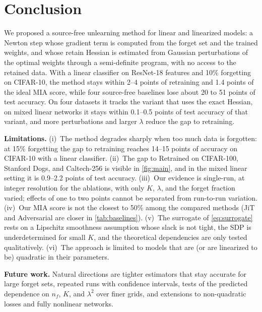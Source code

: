 \documentclass[10pt,twocolumn,letterpaper]{article}
\begin{document}

\section{Conclusion}
\label{sec:conclusion}
We proposed a source-free unlearning method for linear and linearized models: a Newton step whose gradient term is computed from the forget set and the trained weights, and whose retain Hessian is estimated from Gaussian perturbations of the optimal weights through a semi-definite program, with no access to the retained data. With a linear classifier on ResNet-18 features and 10\% forgetting on CIFAR-10, the method stays within 2--4 points of retraining and 1.4 points of the ideal MIA score, while four source-free baselines lose about 20 to 51 points of test accuracy. On four datasets it tracks the variant that uses the exact Hessian, on mixed linear networks it stays within 0.1--0.5 points of test accuracy of that variant, and more perturbations and larger $\lambda$ reduce the gap to retraining.

\noindent\textbf{Limitations.} (i)~The method degrades sharply when too much data is forgotten: at 15\% forgetting the gap to retraining reaches 14--15 points of accuracy on CIFAR-10 with a linear classifier. (ii)~The gap to Retrained on CIFAR-100, Stanford Dogs, and Caltech-256 is visible in \cref{fig:main}, and in the mixed linear setting it is 0.9--2.2 points of test accuracy. (iii)~Our evidence is single-run, at integer resolution for the ablations, with only $K$, $\lambda$, and the forget fraction varied; effects of one to two points cannot be separated from run-to-run variation. (iv)~Our MIA score is not the closest to 50\% among the compared methods (JiT and Adversarial are closer in \cref{tab:baselines}). (v)~The surrogate of \cref{eq:surrogate} rests on a Lipschitz smoothness assumption whose slack is not tight, the SDP is underdetermined for small $K$, and the theoretical dependencies are only tested qualitatively. (vi)~The approach is limited to models that are (or are linearized to be) quadratic in their parameters.

\noindent\textbf{Future work.} Natural directions are tighter estimators that stay accurate for large forget sets, repeated runs with confidence intervals, tests of the predicted dependence on $n_f$, $K$, and $\lambda^2$ over finer grids, and extensions to non-quadratic losses and fully nonlinear networks.
\end{document}
